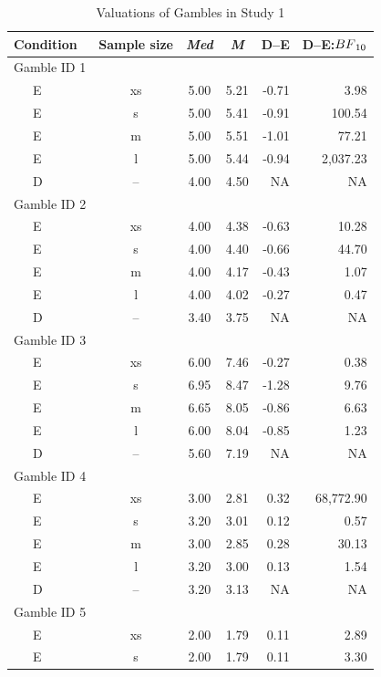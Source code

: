 \documentclass[a4paper, man, floatsintext]{apa6}
\begin{document}
\begin{table}[tbp]
\begin{center}
\begin{threeparttable}
\caption{\label{tab:meansStudy1}Valuations of Gambles in Study 1}
\begin{tabular}{lcccrr}
\toprule
Condition & Sample size & \textit{Med} & \textit{M} & D--E & D--E:$BF\textsubscript{10}$\\
\midrule
Gamble ID 1 &  &  &  &  & \\
\ \ \ E & xs & 5.00 & 5.21 & -0.71 & 3.98\\
\ \ \ E & s & 5.00 & 5.41 & -0.91 & 100.54\\
\ \ \ E & m & 5.00 & 5.51 & -1.01 & 77.21\\
\ \ \ E & l & 5.00 & 5.44 & -0.94 & 2,037.23\\
\ \ \ D & -- & 4.00 & 4.50 & NA & NA\\
Gamble ID 2 &  &  &  &  & \\
\ \ \ E & xs & 4.00 & 4.38 & -0.63 & 10.28\\
\ \ \ E & s & 4.00 & 4.40 & -0.66 & 44.70\\
\ \ \ E & m & 4.00 & 4.17 & -0.43 & 1.07\\
\ \ \ E & l & 4.00 & 4.02 & -0.27 & 0.47\\
\ \ \ D & -- & 3.40 & 3.75 & NA & NA\\
Gamble ID 3 &  &  &  &  & \\
\ \ \ E & xs & 6.00 & 7.46 & -0.27 & 0.38\\
\ \ \ E & s & 6.95 & 8.47 & -1.28 & 9.76\\
\ \ \ E & m & 6.65 & 8.05 & -0.86 & 6.63\\
\ \ \ E & l & 6.00 & 8.04 & -0.85 & 1.23\\
\ \ \ D & -- & 5.60 & 7.19 & NA & NA\\
Gamble ID 4 &  &  &  &  & \\
\ \ \ E & xs & 3.00 & 2.81 & 0.32 & 68,772.90\\
\ \ \ E & s & 3.20 & 3.01 & 0.12 & 0.57\\
\ \ \ E & m & 3.00 & 2.85 & 0.28 & 30.13\\
\ \ \ E & l & 3.20 & 3.00 & 0.13 & 1.54\\
\ \ \ D & -- & 3.20 & 3.13 & NA & NA\\
Gamble ID 5 &  &  &  &  & \\
\ \ \ E & xs & 2.00 & 1.79 & 0.11 & 2.89\\
\ \ \ E & s & 2.00 & 1.79 & 0.11 & 3.30\\

\end{tabular}
\end{threeparttable}
\end{center}
\end{table}
\end{document}
